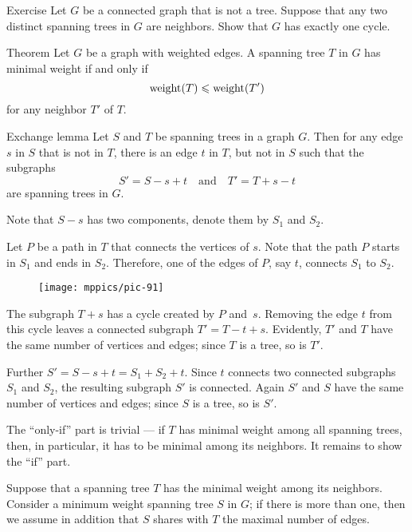 \begin{thm}{Exercise}\label{ex:neighbor-trees}
Let $G$ be a connected graph that is not a tree.
Suppose that any two distinct spanning trees in $G$ are neighbors.
Show that $G$ has exactly one cycle.
\end{thm}

\begin{thm}{Theorem}\label{thm:mst-iff}
Let $G$ be a graph with weighted edges.
A spanning tree $T$ in $G$ has minimal weight if and only if
\[\mathop{\rm weight}\nolimits(T)\leqslant \mathop{\rm weight}\nolimits(T')\]
for any neighbor $T'$ of $T$.
\end{thm}

\begin{thm}{Exchange lemma}
Let $S$ and $T$ be spanning trees in a graph $G$.
Then for any edge $s$ in $S$ that is not in $T$, there is an edge $t$ in $T$, but not in $S$ such that the subgraphs
\[S'=S-s+t\quad\text{and}\quad T'=T+s-t\]
are spanning trees in $G$.
\end{thm}

Note that $S-s$ has two components, denote them by $S_1$ and $S_2$.

Let $P$ be a path in $T$ that connects the vertices of $s$.
Note that the path $P$ starts in $S_1$ and ends in $S_2$.
Therefore, one of the edges of $P$, say $t$, connects $S_1$ to $S_2$.

\begin{figure}[ht!]
\vskip-0mm
\centering
\texttt{[image: mppics/pic-91]}
\end{figure}

The subgraph $T+s$ has a cycle created by $P$ and~$s$.
Removing the edge $t$ from this cycle leaves a connected subgraph $T'=T-t+s$.
Evidently, $T'$ and $T$ have the same number of vertices and edges;
since $T$ is a tree, so is $T'$.

Further $S'=S-s+t=S_1+S_2+t$.
Since $t$ connects two connected subgraphs $S_1$ and $S_2$, the resulting subgraph $S'$ is connected.
Again $S'$ and $S$ have the same number of vertices and edges;
since $S$ is a tree, so is $S'$.
\qeds

 The ``only-if'' part is trivial --- if $T$ has minimal weight among all spanning trees, then, in particular, it has to be minimal among its neighbors. 
It remains to show the ``if'' part.

Suppose that a spanning tree $T$ has the minimal weight among its neighbors.
Consider a minimum weight spanning tree $S$ in $G$;
if there is more than one, then
we assume in addition that $S$ shares with $T$ the maximal number of edges. 


